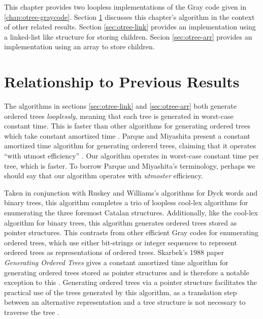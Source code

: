 This chapter provides two loopless implementations of the Gray code given in \ref{chap:otree-graycode}.  
Section \ref{sec:relationship-loopless} discusses this chapter's algorithm in the context of other related results.  Section \ref{sec:otree-link} provides an implementation using a linked-list like structure for storing children.  Secion \ref{sec:otree-arr} provides an implementation using an array to store children.  


\section{Relationship to Previous Results}\label{sec:relationship-loopless}
The algorithms in sections \ref{sec:otree-link} and \ref{sec:otree-arr} both generate ordered trees \emph{looplessly}, meaning that each tree is generated in worst-case constant time.  This is faster than other algorithms for generating ordered trees which take constant amortized time \cite{parque2021efficient} \cite{er1985lexotrees} \cite{zaks1980lexotrees} \cite{skarbek1988pointerotrees}. Parque and Miyashita present a constant amortized time algorithm for generating ordererd trees, claiming that it operates ``with utmost efficiency'' \cite{parque2021efficient}.  Our algorithm operates in worst-case constant time per tree, which is faster. To borrow Parque and Miyashita's terminology, perhaps we should say that our algorithm operates with \emph{utmoster} efficiency. 

Taken in conjunction with Ruskey and Williams's algorithms for Dyck words and binary trees, this algorithm completes a trio of loopless cool-lex algorithms for enumerating the three foremost Catalan structures.  
Additionally, like the cool-lex algorithm for binary trees, this algorithm generates ordered trees stored as pointer structures.  This contrasts from other efficient Gray codes for enumerating ordered trees, which use either bit-strings or integer sequences to represent ordered trees \cite{parque2021efficient} \cite{zaks1980lexotrees} \cite{er1985lexotrees} as representations of ordered trees.  Skarbek's 1988 paper \emph{Generating Ordered Trees} gives a constant amortized time algorithm for generating ordered trees stored as pointer structures and is therefore a notable exception to this \cite{skarbek1988pointerotrees}.
Generating ordered trees via a pointer structure facilitates the practical %
use of the trees generated by this algorithm, as a translation step between an alternative representation and a tree structure is not necessary to traverse the tree .


